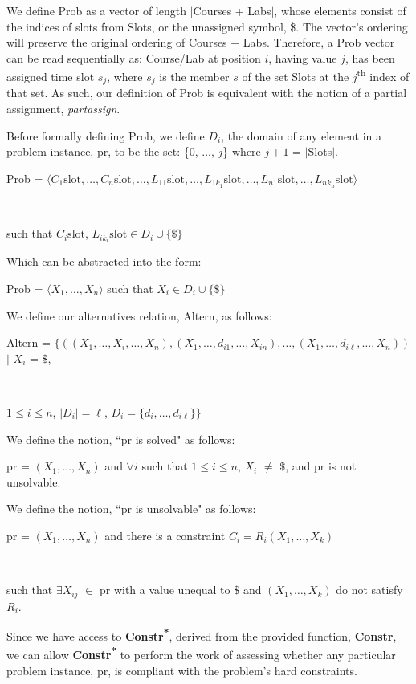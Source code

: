\documentclass[11pt, oneside]{article}   	%
\begin{document}
\noindent We define Prob as a vector of length $\vert$Courses + Labs$\vert$, whose elements consist of the indices of slots from Slots, or the unassigned symbol, \$. The vector's ordering will preserve the original ordering of Courses + Labs. Therefore, a Prob vector can be read sequentially as: Course/Lab at position $i$, having value $j$, has been assigned time slot $s_j$, where $s_j$ is the member $s$ of the set Slots at the $j$\textsuperscript{th} index of that set. As such, our definition of Prob is equivalent with the notion of a partial assignment, \textit{partassign}.

\noindent Before formally defining Prob, we define $D_i$, the domain of any element in a problem instance, pr, to be the set: \{0, $\dots$, $j$\} where $j+1$ = $\vert$Slots$\vert$.

\noindent \centerline{Prob =  $\langle C_1 \text{slot}, \dots, C_n \text{slot}, \dots, L_{11} \text{slot}, \dots, L_{1{k_1}} \text{slot}, \dots, L_{n1} \text{slot}, \dots, L_{n{k_n}} \text{slot}\rangle$}\\
\centerline{such that $C_i \text{slot}$, $L_{i{k_i}} \text{slot} \in D_i \cup \{\$\}$}

\noindent Which can be abstracted into the form:

\noindent \centerline{Prob = $\langle X_1, \dots, X_n\rangle$ such that $X_i \in D_i \cup \{\$\}$}

\noindent We define our alternatives relation, Altern, as follows:

\noindent \centerline{Altern = $\{((X_1, \dots, X_i, \dots, X_n), (X_1, \dots, d_{i1}, \dots, X_{in}), \dots, (X_1, \dots, d_{i\ell}, \dots, X_n))$ $\vert$ $X_i$ = $\$$,}\\
\centerline{$1 \le i \le n$, $\vert D_i \vert = \ell$, $D_i = \{d_i, \dots, d_{i\ell}\}\}$}

\noindent We define the notion, ``pr is solved" as follows:

\noindent \centerline{pr = $(X_1, \dots, X_n)$ and $\forall i$ such that $1 \le i \le n$, $X_i$ $\neq$ $\$$, and pr is not unsolvable.}

\noindent We define the notion, ``pr is unsolvable" as follows:

\noindent \centerline{pr = $(X_1, \dots, X_n)$ and there is a constraint $C_i = R_i(X_1, \dots, X_k)$}\\
\centerline{such that $\exists X_{ij}$ $\in$ pr with a value unequal to $\$$ and $(X_1, \dots, X_k)$ do not satisfy $R_i$.}

\noindent Since we have access to \textbf{Constr\textsuperscript{*}}, derived from the provided function, \textbf{Constr}, we can allow \textbf{Constr\textsuperscript{*}} to perform the work of assessing whether any particular problem instance, pr, is compliant with the problem's hard constraints.
\end{document}
